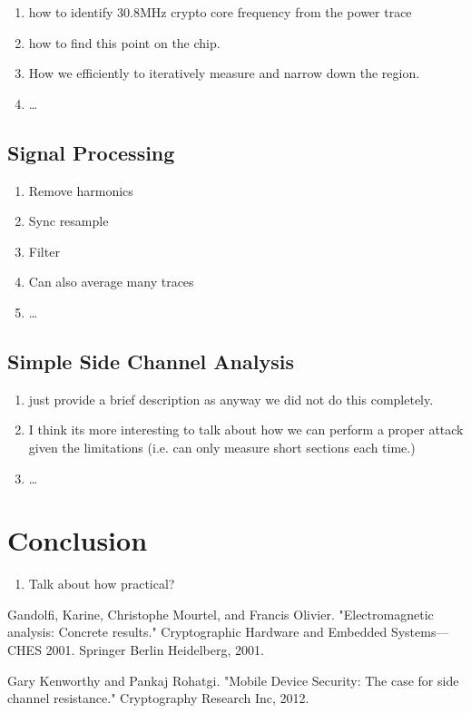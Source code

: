 \documentclass{llncs}
\begin{document}
\begin{enumerate}
  \item how to identify 30.8MHz crypto core frequency from the power trace
  \item how to find this point on the chip. 
  \item How we efficiently to iteratively measure and narrow down the region.
  \item \ldots
\end{enumerate}


\subsection{Signal Processing}

\begin{enumerate}
  \item Remove harmonics
  \item Sync resample
  \item Filter
  \item Can also average many traces
  \item \ldots
\end{enumerate}



\subsection{Simple Side Channel Analysis}

\begin{enumerate}
  \item just provide a brief description as anyway we did not do this completely. 
  \item I think its more interesting to talk about how we can perform a proper attack given the limitations (i.e. can only measure short sections each time.)
  \item \ldots
\end{enumerate}




\section{Conclusion}

\begin{enumerate}
  \item Talk about how practical?
\end{enumerate}



\begin{thebibliography}{99}

Gandolfi, Karine, Christophe Mourtel, and Francis Olivier. "Electromagnetic analysis: Concrete results." Cryptographic Hardware and Embedded Systems—CHES 2001. Springer Berlin Heidelberg, 2001.

Gary Kenworthy and Pankaj Rohatgi. "Mobile Device Security: The case for side channel resistance." Cryptography Research Inc, 2012.


\end{thebibliography}
\end{document}
